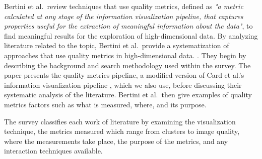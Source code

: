 Bertini et al.\ review techniques that use quality metrics, defined as \textit{"a metric calculated at any stage of the information visualization pipeline, that captures properties useful for the extraction of meaningful information about the data"}, to find meaningful results for the exploration of high-dimensional data. By analyzing literature related to the topic, Bertini et al.\ provide a systematization of approaches that use quality metrics in high-dimensional data. \cite{bertini2011quality}.
They begin by describing the background and search methodology used within the survey. The paper presents the quality metrics pipeline, a modified version of Card et al.'s information visualization pipeline \cite{card1999readings}, which we also use, before discussing their systematic analysis of the literature. Bertini et al.\ then give examples of quality metrics factors such as what is measured, where, and its purpose.

The survey classifies each work of literature by examining the visualization technique, the metrics measured which range from clusters to image quality, where the measurements take place, the purpose of the metrics, and any interaction techniques available.

